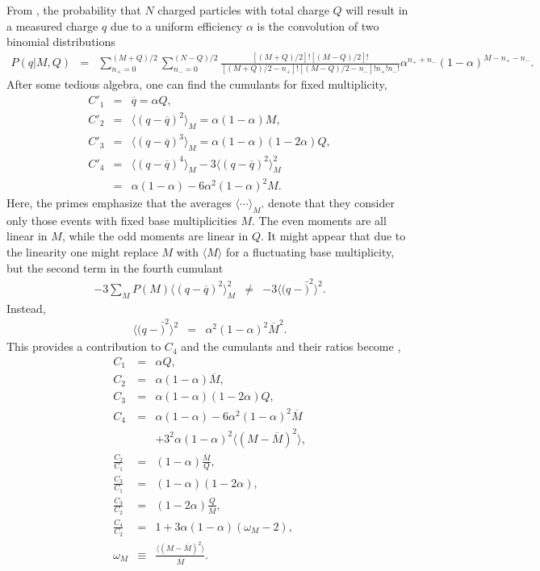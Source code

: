 From \cite{Savchuk:2019xfg}, the probability that $N$ charged particles with total charge $Q$ will result in a measured charge $q$ due to a uniform efficiency $\alpha$ is the convolution of two binomial distributions
\begin{eqnarray}
P(q|M,Q)&=&\sum_{n_+=0}^{(M+Q)/2}\sum_{n_-=0}^{(N-Q)/2}\frac{[(M+Q)/2]![(M-Q)/2]!}{[(M+Q)/2-n_+]![(M-Q)/2-n_-]!n_+!n_-!}
\alpha^{n_++n_-}(1-\alpha)^{M-n_+-n_-}.
\end{eqnarray}
After some tedious algebra, one can find the cumulants for fixed multiplicity,
\begin{eqnarray}
C'_1&=&\overline{q}=\alpha Q,\\
\nonumber
C'_2&=&\langle (q-\overline{q})^2\rangle_M = \alpha(1-\alpha)M,\\
\nonumber
C'_3&=&\langle (q-\overline{q})^3\rangle_M = \alpha(1-\alpha)(1-2\alpha)Q,\\
\nonumber
C'_4&=&\langle(q-\overline{q})^4\rangle_M -3\langle(q-\overline{q})^2\rangle_M^2\\
\nonumber
&=&\alpha(1-\alpha)-6\alpha^2(1-\alpha)^2M.
\end{eqnarray}
Here, the primes emphasize that the averages $\langle\cdots\rangle_M$. denote that they consider only those events with fixed base multiplicities $M$. The even moments are all linear in $M$, while the odd moments are linear in $Q$. It might appear that due to the linearity one might replace $M$ with $\langle M\rangle$ for a fluctuating base multiplicity, but the second term in the fourth cumulant
\begin{eqnarray}
-3\sum_M P(M) \langle(q-\overline{q})^2\rangle_M^2 &\ne&
-3\langle(q-\bar)^2\rangle^2.
\end{eqnarray}
Instead,
\begin{eqnarray}
\langle(q-\bar)^2\rangle^2&=&\alpha^2(1-\alpha)^2\overline{M}^2.
\end{eqnarray}
This provides a contribution to $C_4$ and the cumulants and their ratios become \cite{Savchuk:2019xfg},
\begin{eqnarray}
\label{eq:savchuck}
C_1&=&\alpha Q,\\
\nonumber
C_2&=&\alpha(1-\alpha)\overline{M},\\
\nonumber
C_3&=&\alpha(1-\alpha)(1-2\alpha)Q,\\
\nonumber
C_4&=&\alpha(1-\alpha)-6\alpha^2(1-\alpha)^2\overline{M}\\
\nonumber
&&+3^2\alpha(1-\alpha)^2\langle(M-\overline{M})^2\rangle,\\
\nonumber
\frac{C_2}{C_1}&=&(1-\alpha)\frac{\overline{M}}{Q},\\
\nonumber
\frac{C_3}{C_1}&=&(1-\alpha)(1-2\alpha),\\
\nonumber
\frac{C_3}{C_2}&=&(1-2\alpha)\frac{Q}{\overline{M}},\\
\nonumber
\frac{C_4}{C_2}&=&1+3\alpha(1-\alpha)(\omega_M-2),\\
\nonumber
\omega_M&\equiv&\frac{\langle(M-\overline{M})^2\rangle}{\overline{M}}.
\end{eqnarray}
